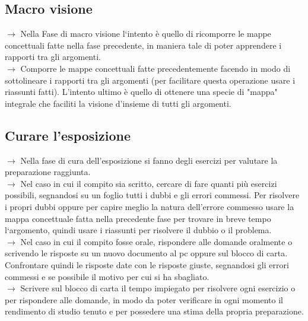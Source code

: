 \documentclass[11pt,a4paper]{article}
\begin{document}
\subsection{Macro visione}
$\rightarrow$ Nella Fase di macro visione l`intento è quello di ricomporre le mappe concettuali fatte nella fase precedente, in maniera tale di poter apprendere i rapporti tra gli argomenti.\\
$\rightarrow$ Comporre le mappe concettuali fatte precedentemente facendo in modo di sottolineare i rapporti tra gli argomenti (per facilitare questa operazione usare i riassunti fatti). L'intento ultimo è quello di ottenere una specie di "mappa" integrale che faciliti la visione d'insieme di tutti gli argomenti.\\

\subsection{Curare l'esposizione}
$\rightarrow$ Nella fase di cura dell'esposizione si fanno degli esercizi per valutare la preparazione raggiunta.\\
$\rightarrow$ Nel caso in cui il compito sia scritto, cercare di fare quanti più esercizi possibili, segnandosi su un foglio tutti i dubbi e gli errori commessi. Per risolvere i propri dubbi oppure per capire meglio la natura dell'errore commesso usare la mappa concettuale fatta nella precedente fase per trovare in breve tempo l`argomento, quindi usare i riassunti per risolvere il dubbio o il problema.\\
$\rightarrow$ Nel caso in cui il compito fosse orale, rispondere alle domande oralmente o scrivendo le risposte su un nuovo documento al pc oppure sul blocco di carta. Confrontare quindi le risposte date con le risposte giuste, segnandosi gli errori commessi e se possibile il motivo per cui si ha sbagliato.\\
$\rightarrow$ Scrivere sul blocco di carta il tempo impiegato per risolvere ogni esercizio o per rispondere alle domande, in modo da poter verificare in ogni momento il rendimento di studio tenuto e per possedere una stima della propria preparazione.\\
\end{document}
